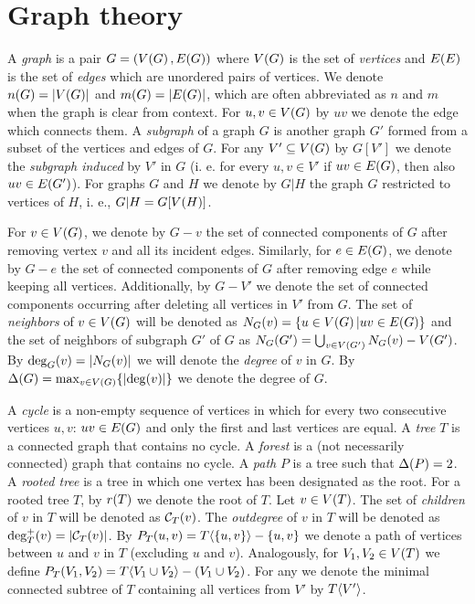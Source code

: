 \section{Graph theory}
\label{sec:graph_theory}
A \textit{graph} is a pair $G=\mathopen{}\left( V\mathopen{}\left( G \right), E\mathopen{}\left( G \right) \right)$ where $V\mathopen{}\left( G \right)$ is the set of \textit{vertices} and $E\mathopen{}\left( E \right)$ is the set of \textit{edges} which are unordered pairs of vertices. We denote $n\mathopen{}\left( G \right)=\mathopen{}\left| V\mathopen{}\left( G \right) \right|$ and $m\mathopen{}\left( G \right)=\mathopen{}\left| E\mathopen{}\left( G \right) \right|$, which are often abbreviated as $n$ and $m$ when the graph is clear from context. For $u,v \in V\mathopen{}\left( G \right)$ by $uv$ we denote the edge which connects them. A \textit{subgraph} of a graph $G$ is another graph $G'$ formed from a subset of the vertices and edges of $G$. For any $V'\subseteq V\mathopen{}\left( G \right)$ by $G[V']$ we denote the \textit{subgraph induced} by $V'$ in $G$ (i. e. for every $u,v\in V'$ if $uv\in E\mathopen{}\left( G \right)$, then also $uv\in E\mathopen{}\left( G' \right)$). For graphs $G$ and $H$ we denote by $G|H$ the graph $G$ restricted to vertices of $H$, i. e., $G|H = G[V\mathopen{}\left( H \right)]$.

For $v \in V\mathopen{}\left( G \right)$, we denote by $G - v$ the set of connected components of $G$ after removing vertex $v$ and all its incident edges. Similarly, for $e \in E\mathopen{}\left( G \right)$, we denote by $G - e$ the set of connected components of $G$ after removing edge $e$ while keeping all vertices.
Additionally, by $G-V'$ we denote the set of connected components occurring after deleting all vertices in $V'$ from $G$. The set of \textit{neighbors} of $v\in V\mathopen{}\left( G \right)$ will be denoted as $N_G\mathopen{}\left( v \right) = \mathopen{}\left\{ u\in V\mathopen{}\left( G \right)|uv\in E\mathopen{}\left( G \right) \right\}$ and the set of neighbors of subgraph $G'$ of $G$ as $N_G\mathopen{}\left( G' \right) = \bigcup_{v\in V\mathopen{}\left( G' \right)}N_G\mathopen{}\left( v \right)-V\mathopen{}\left( G' \right)$. By $\deg_{G}\mathopen{}\left( v \right)=\mathopen{}\left| N_G\mathopen{}\left( v \right) \right|$ we will denote the \textit{degree} of $v$ in $G$. By $\Delta\mathopen{}\left( G \right) = \max_{v\in V\mathopen{}\left( G \right)}\mathopen{}\left\{ \mathopen{}\left| \deg\mathopen{}\left( v \right) \right| \right\}$ we denote the degree of $G$.

A \textit{cycle} is a non-empty sequence of vertices in which for every two consecutive vertices $u,v$: $uv \in E\mathopen{}\left( G \right)$ and only the first and last vertices are equal. A \textit{tree} $T$ is a connected graph that contains no cycle. A \textit{forest} is a (not necessarily connected) graph that contains no cycle. A \textit{path} $P$ is a tree such that $\Delta\mathopen{}\left( P \right) = 2$. 
A \textit{rooted tree} is a tree in which one vertex has been designated as the root. For a rooted tree $T$, by $r\mathopen{}\left( T \right)$ we denote the root of $T$.
Let $v\in V\mathopen{}\left( T \right)$. The set of \textit{children} of $v$ in $T$ will be denoted as $\mathcal{C}_T\mathopen{}\left( v \right)$. The \textit{outdegree} of $v$ in $T$ will be denoted as $\deg_T^+\mathopen{}\left( v \right)=\mathopen{}\left| \mathcal{C}_T\mathopen{}\left( v \right) \right|$.
By $P_{T}\mathopen{}\left( u, v \right)=T\mathopen{}\langle \mathopen{}\left\{ u,v \right\} \rangle-\mathopen{}\left\{ u,v \right\}$ we denote a path of vertices between $u$ and $v$ in $T$ (excluding $u$ and $v$). Analogously, for $V_1,V_2\in V\mathopen{}\left( T \right)$ we define $P_{T}\mathopen{}\left( V_1, V_2 \right)=T\mathopen{}\langle V_1\cup V_2 \rangle-\mathopen{}\left( V_1\cup V_2 \right)$.
For any we denote the minimal connected subtree of $T$ containing all vertices from $V'$ by $T\mathopen{}\langle V' \rangle$.

